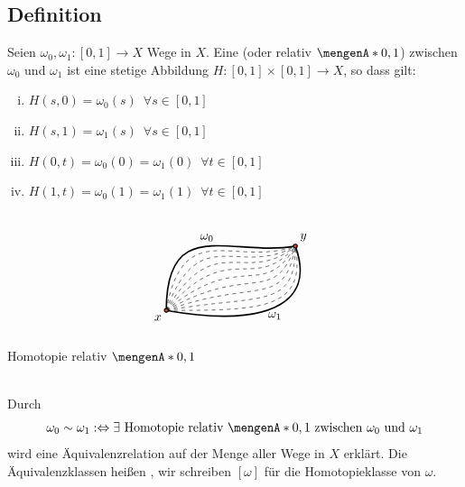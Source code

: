 \subsection[Definition: Homotopie mit festen Endpunkten]{Definition} %
\label{sub:93}
Seien $\omega_0, \omega_1 : [0,1] \to X$ Wege in $X$. Eine  (oder relativ $\set{0,1}$) zwischen 
$\omega_0$ und $\omega_1$ ist eine stetige Abbildung $H : [0,1] \times [0,1] \to X$, so dass gilt: \\
\begin{minipage}[c]{0.45\textwidth}
\begin{enumerate}[(i)]
	\item $H(s,0)= \omega_0(s) \enspace \forall s \in [0,1]$
	\item $H(s,1) = \omega_1(s) \enspace \forall s \in [0,1]$
	\item $H(0,t) = \omega_0(0)= \omega_1(0) \enspace \forall t \in [0,1]$
	\item $H(1,t) = \omega_0(1) = \omega_1(1) \enspace \forall t \in [0,1]$
\end{enumerate}	
\end{minipage} \hfill
\begin{minipage}[c]{0.45\textwidth}
	\captionsetup{type=figure, skip=1pt}
	\[
		\begin{tikzpicture}[scale=0.9]
			\coordinate (x) at (0,0);
			\coordinate (y) at (4,2);
			\draw[very thick] (x) .. controls +(90:3) and +(190:2) .. (y) node[midway, above]{$\omega_0$};
			\foreach \s / \t in {80/200, 70/210, 60/220, 50/230, 40/240, 30/250 , 20/260, 10/270, 0/280} {
				\draw[dashed] (x) .. controls +(\s:3) and +(\t:2) .. (y);
			}
			\draw[very thick] (x) .. controls +(-10:3) and +(-70:2) .. (y) node[midway, below]{$\omega_1$};
			\draw[thick, fill=Tomato3] (x) circle(0.06) node[below left]{$x$};
			\draw[thick, fill=Tomato3] (y) circle(0.06) node[above right]{$y$};
		\end{tikzpicture}
	\]
	\caption{Homotopie relativ $\set{0,1}$}
\end{minipage} \smallskip\\
Durch 
\[
	\omega_0 \sim \omega_1 :\Leftrightarrow \exists \text{ Homotopie relativ } \set{0,1} \text{ zwischen } \omega_0 \text{ und } \omega_1
\]
wird eine Äquivalenzrelation auf der Menge aller Wege in $X$ erklärt. Die Äquivalenzklassen heißen , wir schreiben $[\omega]$ für die 
Homotopieklasse von $\omega$. 

